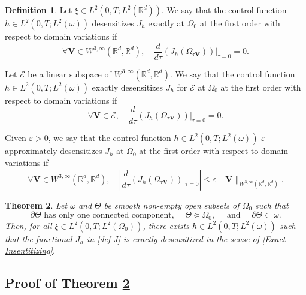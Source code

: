 \documentclass[10pt,a4paper]{amsart}
\newcommand{\bV}{\boldsymbol{V}}
\newcommand\R{{\mathbb R}}
\newtheorem{theorem}{Theorem}[section]
\theoremstyle{definition}
\newtheorem{definition}[theorem]{Definition}
\begin{document}
\begin{definition}
Let {$\xi \in L^2(0,T; L^2(\R^d))$}.
We say that the control function $h \in L^2(0,T; L^2(\omega))$ desensitizes $J_h$ exactly at $\Omega_0$ at the first order with respect to domain variations if
\begin{equation}
\label{Exact-Insentitizing}
\forall\bV\in W^{3,\infty}(\R^d, \R^d),
\quad
\dfrac{d }{d \tau}\left(J_h \left(\Omega_{\tau\bV} \right)\right)\Big|_{\tau=0}=0.
\end{equation}

Let $\mathcal{E}$ be a linear subspace of $W^{3,\infty}(\R^d, \R^d)$.
We say that the control function $h \in L^2(0,T; L^2(\omega))$ exactly desensitizes $J_h$ for $\mathcal{E}$ at $\Omega_0$ at the first order with respect to domain variations if
\begin{equation}
\label{Finite-Insensitizing}
\forall\bV\in \mathcal{E},
\quad
\dfrac{d }{d \tau}\left(J_h \left(\Omega_{\tau\bV} \right)\right)\Big|_{\tau=0}=0.
\end{equation}

Given $\varepsilon>0$, we say that the control function $h \in L^2(0,T; L^2(\omega))$ $\varepsilon$-approximately desensitizes $J_h$ at $\Omega_0$ at the first order with respect to domain variations if
\begin{equation}
\label{Approx-Insensitizing}
\forall\bV\in W^{3,\infty}(\R^d, \R^d),
\quad
\left|\dfrac{d }{d \tau}\left(J_h\left(\Omega_{\tau \bV}\right)\right)\Big|_{\tau=0}\right |\leq \varepsilon \| \bV \|_{W^{3, \infty}(\R^d; \R^d)}.
\end{equation}
\end{definition}

\begin{theorem}
\label{Thm-insensitizing-Boundary}
Let $\omega$ and $\Theta$ be smooth non-empty open subsets of $\Omega_0$ such that
\begin{equation}
\label{Assumption-insensitizing-Boundary}
\partial \Theta \text{ has only one connected component, } \quad \Theta \Subset \Omega_0, \quad \text{ and } \quad \partial \Theta \subset \omega.
\end{equation}
Then, for all $\xi \in L^2(0,T; L^2(\Omega_0))$, there exists $h \in L^2(0,T; L^2(\omega))$ such that the functional $J_h$ in \eqref{def-J} is exactly desensitized in the sense of \eqref{Exact-Insentitizing}.
\end{theorem}

\subsection{Proof of Theorem \ref{Thm-insensitizing-Boundary}}
\label{Sec-Proof-Thm-insensitizing-Boundary}
\end{document}
